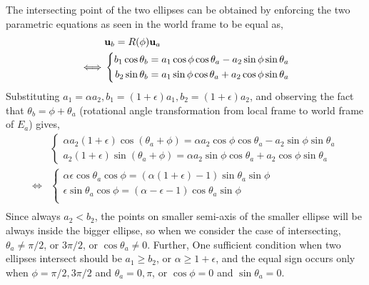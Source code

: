 \documentclass{article}
\begin{document}
\begin{enumerate}
The intersecting point of the two ellipses can be obtained by enforcing the two parametric equations as seen in the world frame to be equal as,
\begin{equation}
\begin{aligned}
& {\bf u}_b = R(\phi) {\bf u}_a \\
\iff & \left\{
\begin{aligned}
b_1 \cos\theta_b = a_1\cos\phi \cos\theta_a - a_2\sin\phi \sin\theta_a\\
b_2 \sin\theta_b = a_1\sin\phi \cos\theta_a + a_2\cos\phi \sin\theta_a
\end{aligned}
\right.\\
\end{aligned}
\end{equation}
Substituting $a_1 = \alpha a_2, b_1 = (1+\epsilon)a_1, b_2 = (1+\epsilon)a_2$, and observing the fact that $\theta_b = \phi + \theta_a$ (rotational angle transformation from local frame to world frame of $E_a$) gives,
\begin{equation}
\begin{aligned}
& \left\{
\begin{aligned}
\alpha a_2 (1+\epsilon) \cos(\theta_a + \phi) = \alpha a_2 \cos\phi \cos\theta_a - a_2\sin\phi \sin\theta_a\\
a_2 (1+\epsilon) \sin(\theta_a + \phi) = \alpha a_2 \sin\phi \cos\theta_a + a_2\cos\phi \sin\theta_a
\end{aligned}
\right. \\
\iff & 
\left\{
\begin{aligned}
\alpha \epsilon \cos\theta_a \cos\phi = (\alpha(1+\epsilon) - 1) \sin\theta_a \sin\phi \\
\epsilon \sin\theta_a \cos\phi = (\alpha - \epsilon - 1) \cos\theta_a \sin\phi \\
\end{aligned}
\right. \\
\end{aligned}
\end{equation}
Since always $a_2 < b_2$, the points on smaller semi-axis of the smaller ellipse will be always inside the bigger ellipse, so when we consider the case of intersecting, $\theta_a \neq \pi/2$, or $3\pi/2$, or $\cos\theta_a \neq 0$. Further, One sufficient condition when two ellipses intersect should be $a_1 \geq b_2$, or $\alpha \geq 1+\epsilon$, and the equal sign occurs only when $\phi = \pi/2, 3\pi/2$ and $\theta_a = 0, \pi$, or $\cos\phi = 0$ and $\sin\theta_a = 0$.


\end{enumerate}
\end{document}
